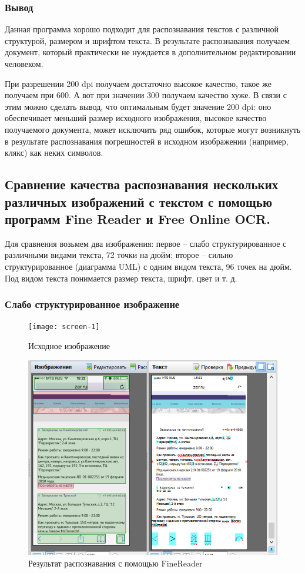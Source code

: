 		\subsubsection{Вывод} Данная программа хорошо подходит для распознавания текстов с различной структурой, размером и шрифтом текста. В результате распознавания получаем документ, который практически не нуждается в дополнительном редактировании человеком. 
		
		При разрешении 200 dpi получаем достаточно высокое качество, такое же получаем при 600. А вот при значении 300 получаем качество хуже. В связи с этим можно сделать вывод, что оптимальным будет значение 200 dpi: оно обеспечивает меньший размер исходного изображения, высокое качество получаемого документа, может исключить ряд ошибок, которые могут возникнуть в результате распознавания погрешностей в исходном изображении (например, клякс) как неких символов.
		
		\subsection{Сравнение качества распознавания нескольких различных изображений с текстом с помощью программ Fine Reader и Free Online OCR.}
		
		Для сравнения возьмем два изображения: первое – слабо структурированное с различными видами текста, 72 точки на дюйм; второе – сильно структурированное (диаграмма UML) с одним видом текста, 96 точек на дюйм. Под видом текста понимается размер текста, шрифт, цвет и т. д.
		
		\subsubsection{Слабо структурированное изображение}
		
			\begin{figure}[h]
				\centering
				\texttt{[image: screen-1]}
				\caption{Исходное изображение}
				\label{fig:screen-1}
			\end{figure}
		
			\begin{figure}[h]
				\centering
				\includegraphics[width=0.7\linewidth]{images/fine-reader-screen}
				\caption{Результат распознавания с помощью FineReader}
				\label{fig:fine-reader-screen}
			\end{figure}
		
